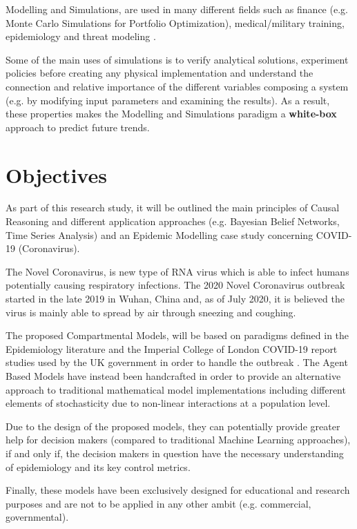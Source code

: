 Modelling and Simulations, are used in many different fields such as finance (e.g. Monte Carlo Simulations for Portfolio Optimization), medical/military training, epidemiology and threat modeling \cite{mod_2, mod_3}. 

Some of the main uses of simulations is to verify analytical solutions, experiment policies before creating any physical implementation and understand the connection and relative importance of the different variables composing a system (e.g. by modifying input parameters and examining the results). As a result, these properties makes the Modelling and Simulations paradigm a \textbf{white-box} approach to predict future trends.

\section{Objectives}
\vspace{-0.1cm}
As part of this research study, it will be outlined the main principles of Causal Reasoning and different application approaches (e.g. Bayesian Belief Networks, Time Series Analysis) and an Epidemic Modelling case study concerning COVID-19 (Coronavirus). 

The Novel Coronavirus, is new type of RNA virus which is able to infect humans potentially causing respiratory infections. The 2020 Novel Coronavirus outbreak started in the late 2019 in Wuhan, China and, as of July 2020, it is believed the virus is mainly able to spread by air through sneezing and coughing. 

The proposed Compartmental Models, will be based on paradigms defined in the Epidemiology literature \cite{adam_k} and the Imperial College of London COVID-19 report studies used by the UK government in order to handle the outbreak \cite{mod_4}. The Agent Based Models have instead been handcrafted in order to provide an alternative approach to traditional mathematical model implementations including different elements of stochasticity due to non-linear interactions at a population level. 

Due to the design of the proposed models, they can potentially provide greater help for decision makers (compared to traditional Machine Learning approaches), if and only if, the decision makers in question have the necessary understanding of epidemiology and its key control metrics. 

Finally, these models have been exclusively designed for educational and research purposes and are not to be applied in any other ambit (e.g. commercial, governmental).

